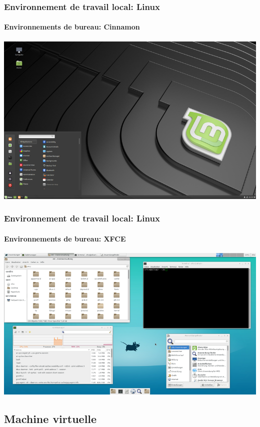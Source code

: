 \documentclass{beamer}
\begin{document}
\begin{frame}
\frametitle{Environnement de travail local: Linux}
\framesubtitle{Environnements de bureau: Cinnamon}

\begin{center}
	\includegraphics[height=
.8\textheight]{../img/Bweb01-environnement/cinnamon.png}
\end{center}

\end{frame}

\begin{frame}
\frametitle{Environnement de travail local: Linux}
\framesubtitle{Environnements de bureau: XFCE}

\begin{center}
	\includegraphics[height=
.8\textheight]{../img/Bweb01-environnement/xfce.png}
\end{center}

\end{frame}

\subsection{Machine virtuelle}
\end{document}
